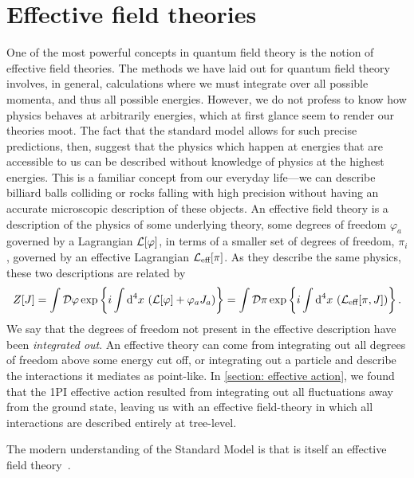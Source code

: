 \section{Effective field theories}


One of the most powerful concepts in quantum field theory is the notion of effective field theories.
The methods we have laid out for quantum field theory involves, in general, calculations where we must integrate over all possible momenta, and thus all possible energies.
However, we do not profess to know how physics behaves at arbitrarily energies, which at first glance seem to render our theories moot.
The fact that the standard model allows for such precise predictions, then, suggest that the physics which happen at energies that are accessible to us can be described without knowledge of physics at the highest energies.
This is a familiar concept from our everyday life---we can describe billiard balls colliding or rocks falling with high precision without having an accurate microscopic description of these objects.
An effective field theory is a description of the physics of some underlying theory, some degrees of freedom $\varphi_a$ governed by a Lagrangian $\mathcal{L}[\varphi]$, in terms of a smaller set of degrees of freedom, $\pi_i$, governed by an effective Lagrangian $\mathcal{L}_\text{eff}[\pi]$.
As they describe the same physics, these two descriptions are related by 
%
\begin{equation}
    Z[J] = \int \mathcal D \varphi \, \text{exp} \left\{ i\int \text{d}^4 x \, \left( \mathcal{L}[\varphi] + \varphi_a J_a \right) \right\}
    = \int \mathcal D \pi\, \text{exp} \left\{ i\int \text{d}^4 x \, \left( \mathcal{L}_\text{eff}[\pi, J]\right) \right\}.
\end{equation}
%
We say that the degrees of freedom not present in the effective description have been \emph{integrated out}.
An effective theory can come from integrating out all degrees of freedom above some energy cut off, or integrating out a particle and describe the interactions it mediates as point-like.
In \autoref{section: effective action}, we found that the 1PI effective action resulted from integrating out all fluctuations away from the ground state, leaving us with an effective field-theory in which all interactions are described entirely at tree-level.

The modern understanding of the Standard Model is that is itself an effective field theory~\autocite{pencoIntroductionEffectiveField2020}.

